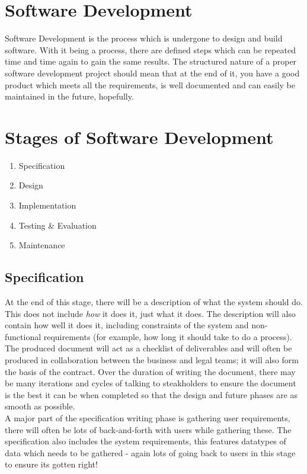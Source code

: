 
\section{Software Development}
Software Development is the process which is undergone to design and build software. With it being a process, there are defined steps which can be repeated time and time again to gain the same results. The structured nature of a proper software development project should mean that at the end of it, you have a good product which meets all the requirements, is well documented and can easily be maintained in the future, hopefully.

\section{Stages of Software Development}
\begin{enumerate}
    \item Specification
    \item Design
    \item Implementation
    \item Testing \& Evaluation 
    \item Maintenance
\end{enumerate}

\subsection{Specification}
At the end of this stage, there will be a description of what the system should do. This does not include \textit{how} it does it, just what it does. The description will also contain how well it does it, including constraints of the system and non-functional requirements (for example, how long it should take to do a process). The produced document will act as a checklist of deliverables and will often be produced in collaboration between the business and legal teams; it will also form the basis of the contract. Over the duration of writing the document, there may be many iterations and cycles of talking to steakholders to ensure the document is the best it can be when completed so that the design and future phases are as smooth as possible.\\

A major part of the specification writing phase is gathering user requirements, there will often be lots of back-and-forth with users while gathering these. The specification also includes the system requirements, this features datatypes of data which needs to be gathered - again lots of going back to users in this stage to ensure its gotten right!

